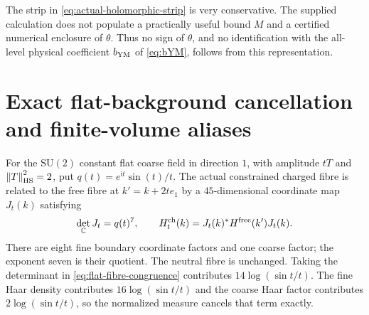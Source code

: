 \documentclass[11pt,oneside,openany]{book}
\theoremstyle{definition}
\theoremstyle{remark}
\newcommand{\C}{\mathbb C}
\newcommand{\ii}{\mathrm i}
\newcommand{\SU}{\mathrm{SU}}
\newcommand{\norm}[1]{\left\lVert#1\right\rVert}
\begin{document}
The strip in \cref{eq:actual-holomorphic-strip} is very conservative.
The supplied calculation does not populate a practically useful bound
$M$ and a certified numerical enclosure of $\theta$. Thus no sign of
$\theta$, and no identification with the all-level physical coefficient
$b_{\rm YM}$ of \cref{eq:bYM}, follows from this representation.

\section{Exact flat-background cancellation and finite-volume aliases}
\label{sec:flat-bloch-cancellation}
For the $\SU(2)$ constant flat coarse field in direction $1$, with
amplitude $tT$ and $\norm T_{\rm HS}^2=2$, put
$q(t)=e^{\ii t}\sin(t)/t$. The actual constrained charged fibre is
related to the free fibre at $k'=k+2te_1$ by a $45$-dimensional
coordinate map $J_t(k)$ satisfying
\begin{equation}\label{eq:flat-fibre-congruence}
 \det_{\C}J_t=q(t)^7,\qquad
 H_t^{\rm ch}(k)=J_t(k)^*H^{\rm free}(k')J_t(k).
\end{equation}
There are eight fine boundary coordinate factors and one coarse factor;
the exponent seven is their quotient. The neutral fibre is unchanged.
Taking the determinant in \cref{eq:flat-fibre-congruence} contributes
$14\log(\sin t/t)$. The fine Haar density contributes
$16\log(\sin t/t)$ and the coarse Haar factor contributes
$2\log(\sin t/t)$, so the normalized measure cancels that term exactly.
\end{document}
